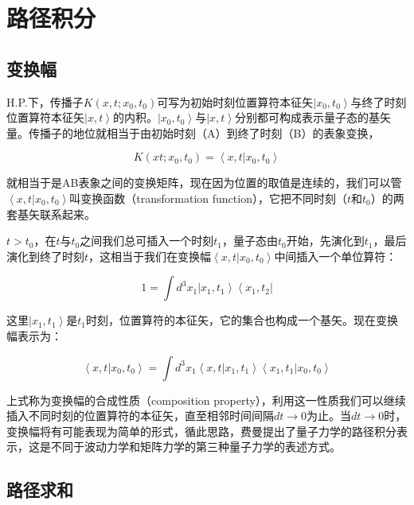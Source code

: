 \section{路径积分}

\subsection{变换幅}

H.P.下，传播子$K(x,t;x_0,t_0)$可写为初始时刻位置算符本征矢$\left| x_0, t_0 \right\rangle$与终了时刻位置算符本征矢$\left| x,t \right\rangle$的内积。$\left| x_0, t_0 \right\rangle$与$\left| x, t \right\rangle$分别都可构成表示量子态的基矢量。传播子的地位就相当于由初始时刻（A）到终了时刻（B）的表象变换，

\begin{equation}
K(xt; x_0,t_0) = \left\langle x,t | x_0, t_0 \right\rangle
\end{equation}

就相当于是AB表象之间的变换矩阵，现在因为位置的取值是连续的，我们可以管$\left\langle x,t | x_0, t_0 \right\rangle$叫变换函数（transformation function），它把不同时刻（$t$和$t_0$）的两套基矢联系起来。

$t> t_0$，在$t$与$t_0$之间我们总可插入一个时刻$t_1$，量子态由$t_0$开始，先演化到$t_1$，最后演化到终了时刻$t$，这相当于我们在变换幅$\left\langle x,t | x_0, t_0 \right\rangle$中间插入一个单位算符：

\begin{equation}
1 = \int d^3 x_1 \left| x_1, t_1 \right\rangle \left\langle x_1, t_2 \right|
\end{equation}

这里$\left| x_1, t_1 \right\rangle$是$t_1$时刻，位置算符的本征矢，它的集合也构成一个基矢。现在变换幅表示为：

\begin{equation}
\left\langle x,t | x_0, t_0 \right\rangle = \int d^3 x_1 \left\langle x,t | x_1, t_1 \right\rangle \left\langle x_1 , t_1 | x_0, t_0 \right\rangle
\end{equation}

上式称为变换幅的合成性质（composition property），利用这一性质我们可以继续插入不同时刻的位置算符的本征矢，直至相邻时间间隔$d t \to 0$为止。当$d t \to 0$时，变换幅将有可能表现为简单的形式，循此思路，费曼提出了量子力学的路径积分表示，这是不同于波动力学和矩阵力学的第三种量子力学的表述方式。

\subsection{路径求和}

